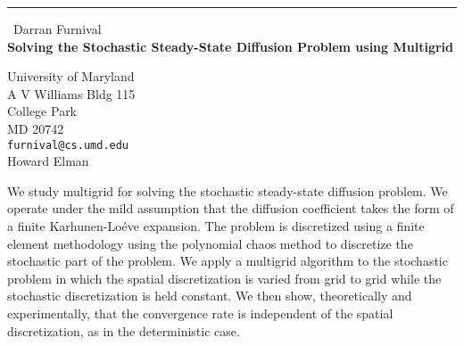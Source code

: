 \documentclass{report}
\begin{document}
\begin{center}
\rule{6in}{1pt} \
{\large Darran Furnival \\
{\bf Solving the Stochastic Steady-State Diffusion Problem using Multigrid}}

University of Maryland \\ A V Williams Bldg 115 \\ College Park \\ MD 20742
\\
{\tt furnival@cs.umd.edu}\\
Howard Elman\end{center}

We study multigrid for solving the stochastic steady-state diffusion
problem. We operate under the mild assumption that the diffusion
coefficient takes the form of a finite Karhunen-Lo\'eve expansion. The
problem is discretized using a finite element methodology using the
polynomial chaos method to discretize the stochastic part of the problem.
We apply a multigrid algorithm to the stochastic problem in which the
spatial discretization is varied from grid to grid while the stochastic
discretization is held constant. We then show, theoretically and
experimentally, that the convergence rate is independent of the spatial
discretization, as in the deterministic case.
\end{document}
